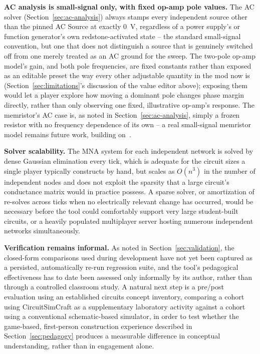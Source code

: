 \textbf{AC analysis is small-signal only, with fixed op-amp pole values.} The AC solver
(Section~\ref{sec:ac-analysis}) always stamps every independent source other than the pinned
AC Source at exactly 0~V, regardless of a power supply's or function generator's own
redstone-activated state -- the standard small-signal convention, but one that does not
distinguish a source that is genuinely switched off from one merely treated as an AC ground
for the sweep. The two-pole op-amp model's gain, and both pole frequencies, are fixed
constants rather than exposed as an editable preset the way every other adjustable quantity
in the mod now is (Section~\ref{sec:limitations}'s discussion of the value editor above);
exposing them would let a player explore how moving a dominant pole changes phase margin
directly, rather than only observing one fixed, illustrative op-amp's response. The
memristor's AC case is, as noted in Section~\ref{sec:ac-analysis}, simply a frozen resistor
with no frequency dependence of its own -- a real small-signal memristor model remains
future work, building on~\cite{gater2026smallsignal,gater2025bodeplots}.

\textbf{Solver scalability.} The MNA system for each independent network is solved by dense
Gaussian elimination every tick, which is adequate for the circuit sizes a single player
typically constructs by hand, but scales as $O(n^3)$ in the number of independent nodes and
does not exploit the sparsity that a large circuit's conductance matrix would in practice
possess. A sparse solver, or amortization of re-solves across ticks when no electrically
relevant change has occurred, would be necessary before the tool could comfortably support
very large student-built circuits, or a heavily populated multiplayer server hosting
numerous independent networks simultaneously.

\textbf{Verification remains informal.} As noted in Section~\ref{sec:validation}, the
closed-form comparisons used during development have not yet been captured as a persisted,
automatically re-run regression suite, and the tool's pedagogical effectiveness has to date
been assessed only informally by its author, rather than through a controlled classroom
study. A natural next step is a pre/post evaluation using an established circuits concept
inventory, comparing a cohort using CircuitSimCraft as a supplementary laboratory activity
against a cohort using a conventional schematic-based simulator, in order to test whether
the game-based, first-person construction experience described in Section~\ref{sec:pedagogy}
produces a measurable difference in conceptual understanding, rather than in engagement
alone.

